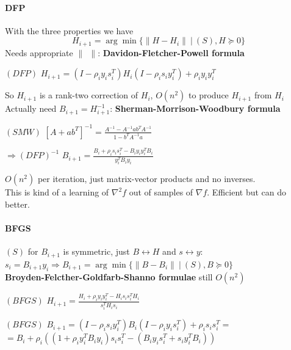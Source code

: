 \documentclass[10pt]{report}
\begin{document}
\paragraph{DFP} With the three properties we have $$H_{i+1} = \arg\min\{\|H-H_i\|\:|\:(S), H\succeq 0\}$$
Needs appropriate $\|\:\:\|$: \textbf{Davidon-Fletcher-Powell formula}
\begin{list}{}{}
	\item[$(DFP)$] $H_{i+1} = (I - \rho_iy_is_i^T)H_i(I-\rho_is_iy_i^T)+\rho_iy_iy_i^T$
\end{list}
So $H_{i+1}$ is a rank-two correction of $H_i$, $O(n^2)$ to produce $H_{i+1}$ from $H_i$\\
Actually need $B_{i+1} = H_{i+1}^{-1}$: \textbf{Sherman-Morrison-Woodbury formula}
\begin{list}{}{}
	\item[$(SMW)$] $[A+ab^T]^{-1} = \frac{\displaystyle A^{-1} - A^{-1}ab^TA^{-1}}{\displaystyle 1-b^TA^{-1}a}$
	\item[$\Rightarrow (DFP)^{-1}$] $B_{i+1} = \frac{\displaystyle B_i + \rho_is_is_i^T - B_iy_iy_i^TB_i}{\displaystyle y_i^TB_iy_i}$
\end{list}
$O(n^2)$ per iteration, just matrix-vector products and no inverses.\\
This is kind of a learning of $\nabla^2 f$ out of samples of $\nabla f$. Efficient but can do better.
\paragraph{BFGS} $(S)$ for $B_{i+1}$ is symmetric, just $B \leftrightarrow H$ and $s \leftrightarrow y$: $s_i = B_{i+1}y_i \Rightarrow B_{i+1} = \arg\min\{\|B-B_i\|\:|\:(S),B\succeq 0\}$\\
\textbf{Broyden-Felcther-Goldfarb-Shanno formulae} still $O(n^2)$\begin{list}{}{}
	\item[$(BFGS)$] $H_{i+1} = \frac{\displaystyle H_i + \rho_iy_iy_i^T - H_is_is_i^TH_i}{\displaystyle s_i^TH_is_i}$
	\item[$(BFGS)$] $B_{i+1} = (I-\rho_is_iy_i^T)B_i(I-\rho_iy_is_i^T)+\rho_is_is_i^T=$\\$= B_i+\rho_i((1+\rho_iy_i^TB_iy_i)s_is_i^T - (B_iy_is_i^T+s_iy_i^TB_i))$
\end{list}
\end{document}
